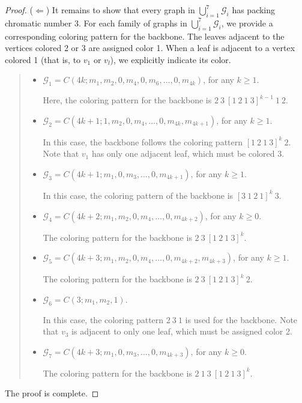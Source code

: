\documentclass{article}
\begin{document}
\begin{proof}
\vspace{0.3cm}
 ($\Leftarrow$) It remains to show that every graph in $\bigcup_{i=1}^7 \mathcal{G}_i$ has packing chromatic number 3. For each family of graphs in $\bigcup_{i=1}^7 \mathcal{G}_i$, we provide a corresponding coloring pattern for the backbone. The leaves adjacent to the vertices colored 2 or 3 are assigned color 1. When a leaf is adjacent to a vertex colored 1 (that is, to $v_1$ or $v_l$), we explicitly indicate its color.

\begin{quote}
    
\begin{itemize}
        \item $\mathcal{G}_1=C(4k; m_1, m_2, 0,m_4,0, m_6, \ldots,0,m_{4k})$, for any $k\geq 1$. 
        
        
        Here, the coloring pattern for the backbone is $2\ 3\ [1\ 2\ 1\ 3]^{k-1}\ 1\ 2$.
        \item $\mathcal{G}_2=C(4k+1; 1, m_2,0,m_4,\ldots,0,m_{4k},m_{4k+1})$, for any $k\geq 1$.

        
        In this case, the backbone follows the coloring pattern $[1\ 2\ 1\ 3]^k \ 2$. Note that $v_1$ has only one adjacent leaf, which must be colored 3.
        \item $\mathcal{G}_3=C(4k+1; m_1, 0,m_3,\ldots, 0,m_{4k+1})$, for any $k\geq 1$.
    
        In this case, the coloring pattern of the backbone is $[3\ 1\ 2\ 1]^k\ 3$.
    \item $\mathcal{G}_4=C(4k+2; m_1, m_2,0,m_4,\ldots, 0,m_{4k+2})$, for any $k\geq 0$.
    
    The coloring pattern for the backbone is $2\ 3\ [1\ 2\ 1\ 3]^k$.
    \item $\mathcal{G}_5=C(4k+3; m_1, m_2, 0, m_4, \ldots, 0, m_{4k+2},m_{4k+3})$, for any $k\geq 1$.
    
    The coloring pattern for the backbone is $2\ 3\ [1\ 2\ 1\ 3]^k \ 2$.
    \item $\mathcal{G}_6=C(3; m_1,m_2,1)$.

    In this case, the coloring pattern $2\ 3\ 1$ is used for the backbone. Note that $v_3$ is adjacent to only one leaf, which must be assigned color 2.
    
    \item $\mathcal{G}_7=C(4k+3;m_1,0,m_3,\ldots, 0,m_{4k+3})$, for any $k\geq 0$.

    The coloring pattern for the backbone is $2\ 1\ 3\ [1\ 2\ 1\ 3]^k$.
    \end{itemize}

\end{quote}
 The proof is complete.
\end{proof}
\end{document}
